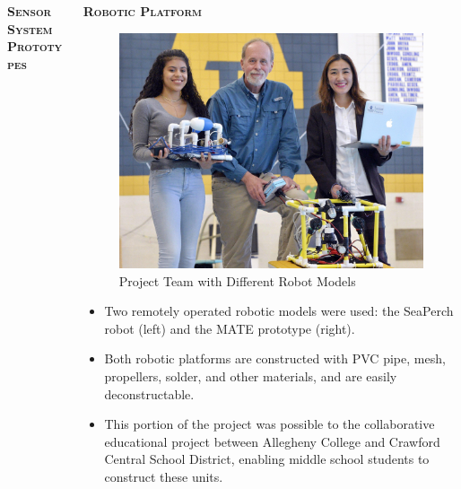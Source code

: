 \documentclass[final,t]{beamer}
\begin{document}
\begin{frame}{}
\begin{columns}
\begin{column}{.5\linewidth}
\begin{block}{\textsc{\textbf{Sensor System Prototypes}}}
  					\end{block}
            \end{column}

            \begin{column}{.5\linewidth}

                \begin{block}{\textsc{\textbf{Robotic Platform}}}
                    \vspace*{3mm}
                    \begin{figure}
                    \centering
                        \includegraphics[scale = 0.9]{assets/group_pic.jpg}
                        \caption{Project Team with Different Robot Models}
                    \end{figure}

                    \begin{itemize}
                    	\item Two remotely operated robotic models were used: the
                      SeaPerch robot (left) and the MATE prototype (right).
                    	\item Both robotic platforms are constructed with PVC pipe,
                      mesh, propellers, solder, and other materials, and are easily
                      deconstructable.
                    	\item This portion of the project was possible to the
                      collaborative educational project between Allegheny College
                      and Crawford Central School District, enabling middle school
                      students to construct these units.
                    \end{itemize}


\end{block}
\end{column}
\end{columns}
\end{frame}
\end{document}
